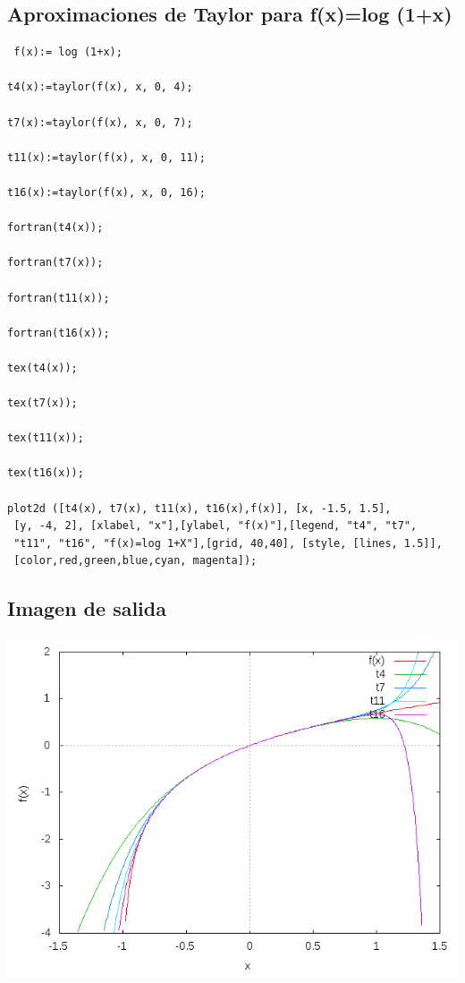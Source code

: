 \documentclass[letterpaper,10pt,twoside,onecolumn]{article}
\begin{document}
\subsection{Aproximaciones de Taylor para f(x)=log (1+x)}
\begin{verbatim} f(x):= log (1+x);

t4(x):=taylor(f(x), x, 0, 4);

t7(x):=taylor(f(x), x, 0, 7);

t11(x):=taylor(f(x), x, 0, 11);

t16(x):=taylor(f(x), x, 0, 16);

fortran(t4(x));

fortran(t7(x));

fortran(t11(x));

fortran(t16(x));

tex(t4(x));

tex(t7(x));

tex(t11(x));

tex(t16(x));

plot2d ([t4(x), t7(x), t11(x), t16(x),f(x)], [x, -1.5, 1.5],
 [y, -4, 2], [xlabel, "x"],[ylabel, "f(x)"],[legend, "t4", "t7", 
 "t11", "t16", "f(x)=log 1+X"],[grid, 40,40], [style, [lines, 1.5]], 
 [color,red,green,blue,cyan, magenta]);
\end{verbatim}
\subsection{Imagen de salida}
\includegraphics[scale=.55]{Log.png}
\end{document}

